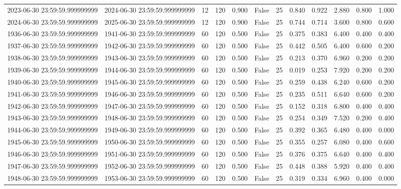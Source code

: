 \begin{table}
\begin{tabular}{lccccccccccc}
2023-06-30 23:59:59.999999999 & 2024-06-30 23:59:59.999999999 & 12 & 120 & 0.900 & False & 25 & 0.840 & 0.922 & 2.880 & 0.800 & 1.000 \\
2024-06-30 23:59:59.999999999 & 2025-06-30 23:59:59.999999999 & 12 & 120 & 0.900 & False & 25 & 0.744 & 0.714 & 3.600 & 0.800 & 0.600 \\
1936-06-30 23:59:59.999999999 & 1941-06-30 23:59:59.999999999 & 60 & 120 & 0.500 & False & 25 & 0.375 & 0.383 & 6.400 & 0.400 & 0.400 \\
1937-06-30 23:59:59.999999999 & 1942-06-30 23:59:59.999999999 & 60 & 120 & 0.500 & False & 25 & 0.442 & 0.505 & 6.400 & 0.600 & 0.200 \\
1938-06-30 23:59:59.999999999 & 1943-06-30 23:59:59.999999999 & 60 & 120 & 0.500 & False & 25 & 0.213 & 0.370 & 6.960 & 0.200 & 0.200 \\
1939-06-30 23:59:59.999999999 & 1944-06-30 23:59:59.999999999 & 60 & 120 & 0.500 & False & 25 & 0.019 & 0.253 & 7.920 & 0.200 & 0.200 \\
1940-06-30 23:59:59.999999999 & 1945-06-30 23:59:59.999999999 & 60 & 120 & 0.500 & False & 25 & 0.259 & 0.438 & 6.240 & 0.600 & 0.200 \\
1941-06-30 23:59:59.999999999 & 1946-06-30 23:59:59.999999999 & 60 & 120 & 0.500 & False & 25 & 0.235 & 0.511 & 6.640 & 0.600 & 0.200 \\
1942-06-30 23:59:59.999999999 & 1947-06-30 23:59:59.999999999 & 60 & 120 & 0.500 & False & 25 & 0.152 & 0.318 & 6.800 & 0.400 & 0.400 \\
1943-06-30 23:59:59.999999999 & 1948-06-30 23:59:59.999999999 & 60 & 120 & 0.500 & False & 25 & 0.254 & 0.349 & 7.520 & 0.200 & 0.400 \\
1944-06-30 23:59:59.999999999 & 1949-06-30 23:59:59.999999999 & 60 & 120 & 0.500 & False & 25 & 0.392 & 0.365 & 6.480 & 0.400 & 0.000 \\
1945-06-30 23:59:59.999999999 & 1950-06-30 23:59:59.999999999 & 60 & 120 & 0.500 & False & 25 & 0.355 & 0.257 & 6.080 & 0.400 & 0.600 \\
1946-06-30 23:59:59.999999999 & 1951-06-30 23:59:59.999999999 & 60 & 120 & 0.500 & False & 25 & 0.376 & 0.375 & 6.640 & 0.400 & 0.400 \\
1947-06-30 23:59:59.999999999 & 1952-06-30 23:59:59.999999999 & 60 & 120 & 0.500 & False & 25 & 0.448 & 0.388 & 5.920 & 0.400 & 0.400 \\
1948-06-30 23:59:59.999999999 & 1953-06-30 23:59:59.999999999 & 60 & 120 & 0.500 & False & 25 & 0.319 & 0.334 & 6.960 & 0.400 & 0.000 \\

\end{tabular}
\end{table}
